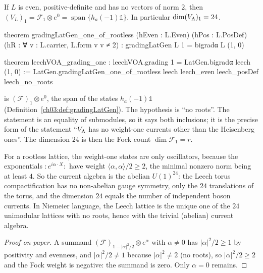 \begin{theorem}\label{ch03:thm:rootless}
If $L$ is even, positive-definite and has no vectors of norm $2$, then
$(V_L)_1=\mathcal F_1\otimes e^0=\operatorname{span}\{h_a(-1)\mathbb 1\}$. In particular
$\dim(V_{\Lambda})_1=24$.
\end{theorem}
\begin{leancode}
theorem gradingLatGen_one_of_rootless (hEven : L.Even) (hPos : L.PosDef)
    (hR : ∀ v : L.carrier, L.form v v ≠ 2) :
    gradingLatGen L 1 = bigradα L (1, 0)

theorem leechVOA_grading_one :
    leechVOA.grading 1 = LatGen.bigradα leech (1, 0) :=
  LatGen.gradingLatGen_one_of_rootless leech leech_even leech_posDef leech_no_roots
\end{leancode}

\begin{dictionary}
 is $(\mathcal F)_1\otimes e^0$, the span of the states $h_a(-1)\mathbb 1$
(Definition~\ref{ch03:def:gradingLatGen}). The hypothesis  is ``no roots''. The
statement is an equality of submodules, so it says both inclusions; it is the precise form of the
statement ``$V_{\Lambda}$ has no weight-one currents other than the Heisenberg ones''. The dimension
$24$ is then the Fock count $\dim\mathcal F_1=r$.
\end{dictionary}

\begin{physics}
For a rootless lattice, the weight-one states are only oscillators, because the exponentials $:\!e^{i\alpha\cdot X}\!:$ have weight $\langle\alpha,\alpha\rangle/2\ge2$, the minimal nonzero norm being at least $4$. So the current algebra is the abelian $U(1)^{24}$: the Leech torus compactification has no non-abelian gauge symmetry, only the $24$ translations of the torus, and the dimension $24$ equals the number of independent boson currents. In Niemeier language, the Leech lattice is the unique one of the $24$ unimodular lattices with no roots, hence with the trivial (abelian) current algebra.
\end{physics}

\begin{proof}[Proof on paper]
A summand $(\mathcal F)_{1-|\alpha|^2/2}\otimes e^\alpha$ with $\alpha\neq0$ has
$|\alpha|^2/2\geq1$ by positivity and evenness, and $|\alpha|^2/2\neq1$ because $|\alpha|^2\ne2$
(no roots), so
$|\alpha|^2/2\geq2$ and the Fock weight is negative: the summand is zero. Only $\alpha=0$ remains.
\end{proof}

